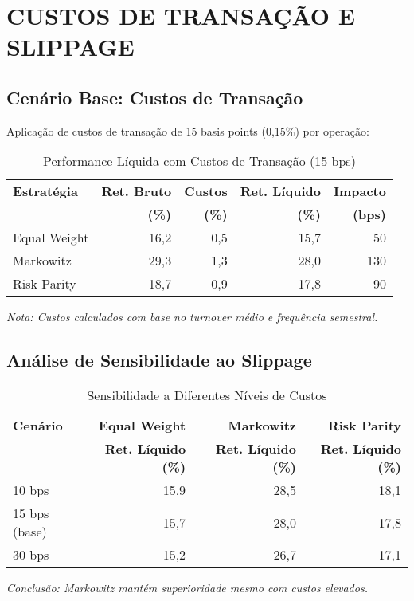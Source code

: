 \section{CUSTOS DE TRANSAÇÃO E SLIPPAGE}

\subsection{Cenário Base: Custos de Transação}

Aplicação de custos de transação de 15 basis points (0,15\%) por operação:

\begin{table}[H]
\centering
\caption{Performance Líquida com Custos de Transação (15 bps)}
\begin{tabular}{|l|r|r|r|r|}
\hline
\textbf{Estratégia} & \textbf{Ret. Bruto} & \textbf{Custos} & \textbf{Ret. Líquido} & \textbf{Impacto} \\
& \textbf{(\%)} & \textbf{(\%)} & \textbf{(\%)} & \textbf{(bps)} \\
\hline
Equal Weight & 16,2 & 0,5 & 15,7 & 50 \\
\hline
Markowitz & 29,3 & 1,3 & 28,0 & 130 \\
\hline
Risk Parity & 18,7 & 0,9 & 17,8 & 90 \\
\hline
\end{tabular}

\textit{Nota: Custos calculados com base no turnover médio e frequência semestral.}
\label{tab:custos_transacao}
\end{table}

\subsection{Análise de Sensibilidade ao Slippage}

\begin{table}[H]
\centering
\caption{Sensibilidade a Diferentes Níveis de Custos}
\begin{tabular}{|l|r|r|r|}
\hline
\textbf{Cenário} & \textbf{Equal Weight} & \textbf{Markowitz} & \textbf{Risk Parity} \\
& \textbf{Ret. Líquido (\%)} & \textbf{Ret. Líquido (\%)} & \textbf{Ret. Líquido (\%)} \\
\hline
10 bps & 15,9 & 28,5 & 18,1 \\
\hline
15 bps (base) & 15,7 & 28,0 & 17,8 \\
\hline
30 bps & 15,2 & 26,7 & 17,1 \\
\hline
\end{tabular}

\textit{Conclusão: Markowitz mantém superioridade mesmo com custos elevados.}
\label{tab:sensibilidade_custos}
\end{table}

